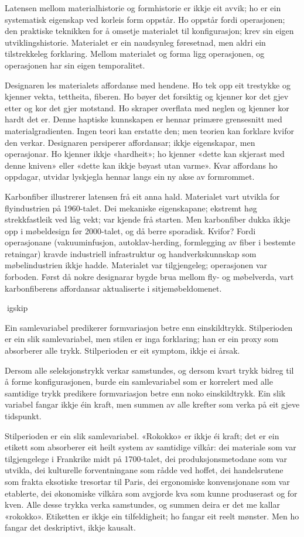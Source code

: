 Latensen mellom materialhistorie og formhistorie er ikkje eit avvik; ho er ein systematisk eigenskap ved korleis form oppstår. Ho oppstår fordi operasjonen; den praktiske teknikken for å omsetje materialet til konfigurasjon; krev sin eigen utviklingshistorie. Materialet er ein naudsynleg føresetnad, men aldri ein tilstrekkeleg forklaring. Mellom materialet og forma ligg operasjonen, og operasjonen har sin eigen temporalitet.

Designaren les materialets affordanse med hendene. Ho tek opp eit trestykke og kjenner vekta, tettheita, fiberen. Ho bøyer det forsiktig og kjenner kor det gjev etter og kor det gjer motstand. Ho skraper overflata med neglen og kjenner kor hardt det er. Denne haptiske kunnskapen er hennar primære grensesnitt med materialgradienten. Ingen teori kan erstatte den; men teorien kan forklare kvifor den verkar. Designaren persiperer affordansar; ikkje eigenskapar, men operasjonar. Ho kjenner ikkje «hardheit»; ho kjenner «dette kan skjerast med denne kniven» eller «dette kan ikkje bøyast utan varme». Kvar affordans ho oppdagar, utvidar lyskjegla hennar langs ein ny akse av formrommet.

Karbonfiber illustrerer latensen frå eit anna hald. Materialet vart utvikla for flyindustrien på 1960-talet. Dei mekaniske eigenskapane; ekstremt høg strekkfastleik ved låg vekt; var kjende frå starten. Men karbonfiber dukka ikkje opp i møbeldesign før 2000-talet, og då berre sporadisk. Kvifor? Fordi operasjonane (vakuuminfusjon, autoklav-herding, formlegging av fiber i bestemte retningar) kravde industriell infrastruktur og handverkskunnskap som møbelindustrien ikkje hadde. Materialet var tilgjengeleg; operasjonen var forboden. Først då nokre designarar bygde brua mellom fly- og møbelverda, vart karbonfiberens affordansar aktualiserte i sitjemøbeldomenet.

igskip

Ein samlevariabel predikerer formvariasjon betre enn einskildtrykk. Stilperioden er ein slik samlevariabel, men stilen er inga forklaring; han er ein proxy som absorberer alle trykk. Stilperioden er eit symptom, ikkje ei årsak.

Dersom alle seleksjonstrykk verkar samstundes, og dersom kvart trykk bidreg til å forme konfigurasjonen, burde ein samlevariabel som er korrelert med alle samtidige trykk predikere formvariasjon betre enn noko einskildtrykk. Ein slik variabel fangar ikkje éin kraft, men summen av alle krefter som verka på eit gjeve tidspunkt.

Stilperioden er ein slik samlevariabel. «Rokokko» er ikkje éi kraft; det er ein etikett som absorberer eit heilt system av samtidige vilkår: dei materiale som var tilgjengelege i Frankrike midt på 1700-talet, dei produksjonsmetodane som var utvikla, dei kulturelle forventningane som rådde ved hoffet, dei handelsrutene som frakta eksotiske tresortar til Paris, dei ergonomiske konvensjonane som var etablerte, dei økonomiske vilkåra som avgjorde kva som kunne produserast og for kven. Alle desse trykka verka samstundes, og summen deira er det me kallar «rokokko». Etiketten er ikkje ein tilfeldigheit; ho fangar eit reelt mønster. Men ho fangar det deskriptivt, ikkje kausalt.

